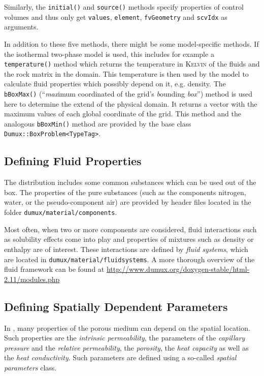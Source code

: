 Similarly, the \texttt{initial()} and \texttt{source()} methods
specify properties of control volumes and thus only get
\texttt{values}, \texttt{element}, \texttt{fvGeometry} and
\texttt{scvIdx} as arguments.

In addition to these five methods, there might be some model-specific
methods. If the isothermal two-phase model is used, this includes for
example a \texttt{temperature()} method which returns the temperature
in \textsc{Kelvin} of the fluids and the rock matrix in the
domain. This temperature is then used by the model to calculate fluid
properties which possibly depend on it, e.g. density. The
\texttt{bBoxMax()} (``\textit{max}imum coordinated of the grid's
\textit{b}ounding \textit{box}'') method is used here to
determine the extend of the physical domain. It returns a vector with the
maximum values of each global coordinate of the grid. This method
and the analogous \texttt{bBoxMin()} method are provided by the base
class \texttt{Dumux::BoxProblem<TypeTag>}.

\subsection{Defining Fluid Properties}
\label{tutorial-implicit:description-fluid-class}
The \Dumux distribution includes some common substances which can be
used out of the box. The properties of the pure substances (such as
the components nitrogen, water, or the pseudo-component air) are
provided by header files located in the folder
\verb+dumux/material/components+.

Most often, when two or more components are considered, fluid
interactions such as solubility effects come into play and properties
of mixtures such as density or enthalpy are of interest. These
interactions are defined by {\em fluid systems}, which are located in
\verb+dumux/material/fluidsystems+. A more thorough overview of the
\Dumux fluid framework can be found 
at \url{http://www.dumux.org/doxygen-stable/html-2.11/modules.php}


\subsection{Defining Spatially Dependent Parameters}
\label{tutorial-implicit:description-spatialParameters}
In \Dumux, many properties of the porous medium can depend on the
spatial location. Such properties are the \textit{intrinsic
  permeability}, the parameters of the \textit{capillary pressure} and
the \textit{relative permeability}, the \textit{porosity}, the
\textit{heat capacity} as well as the \textit{heat conductivity}. Such
parameters are defined using a so-called \textit{spatial parameters}
class.

